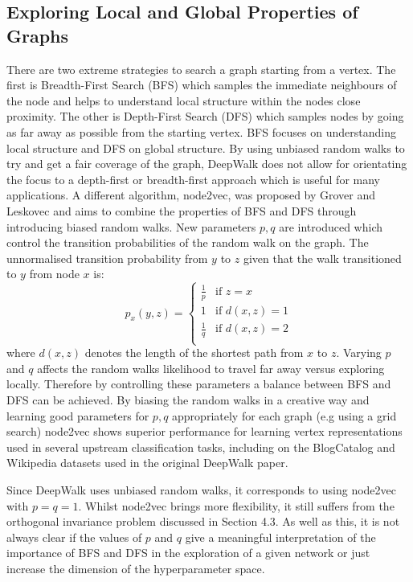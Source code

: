 \documentclass[a4paper]{article}
\begin{document}
\subsection{Exploring Local and Global Properties of Graphs}
There are two extreme strategies to search a graph starting from a vertex. The
first is Breadth-First Search (BFS) which samples the immediate neighbours of
the node and helps to understand local structure within the nodes close
proximity. The other is Depth-First Search (DFS) which samples nodes by going as
far away as possible from the starting vertex. BFS focuses on understanding
local structure and DFS on global structure. By using unbiased random walks to
try and get a fair coverage of the graph, DeepWalk does not allow for
orientating the focus to a depth-first or breadth-first approach which is useful
for many applications. A different algorithm, node2vec, was proposed by Grover
and Leskovec \cite{grover_leskovec2016} and aims to combine the
properties of BFS and DFS through introducing biased random walks. New
parameters $p,q$ are introduced which control the transition probabilities of
the random walk on the graph. The unnormalised transition probability from $y$
to $z$ given that the walk transitioned to $y$ from node $x$ is:
\begin{equation*}
  p_x(y,z)= 
  \begin{cases}
    \frac{1}{p}& \text{if } z = x\\
    1          & \text{if } d(x,z) = 1\\
    \frac{1}{q}& \text{if } d(x,z) = 2\\
  \end{cases}
\end{equation*}
where $d(x,z)$ denotes the length of the shortest path from $x$ to $z$. Varying $p$ and $q$ affects the random walks likelihood to travel far away
versus exploring locally. Therefore by controlling these parameters a balance
between BFS and DFS can be achieved. By biasing the random walks in a creative
way and learning good parameters for $p,q$ appropriately for each graph (e.g
using a grid search) node2vec shows superior performance for learning vertex
representations used in several upstream classification tasks, including on
the BlogCatalog and Wikipedia datasets used in the original DeepWalk paper.

Since DeepWalk uses unbiased random walks, it corresponds to using node2vec with $p=q=1$. Whilst node2vec brings
more flexibility, it still suffers from the orthogonal invariance problem discussed in Section 4.3. As well as this, it is not always clear if the values of $p$ and $q$ give a
meaningful interpretation of the importance of BFS and DFS in the exploration of a given network or just increase the dimension of the hyperparameter space.
\end{document}
